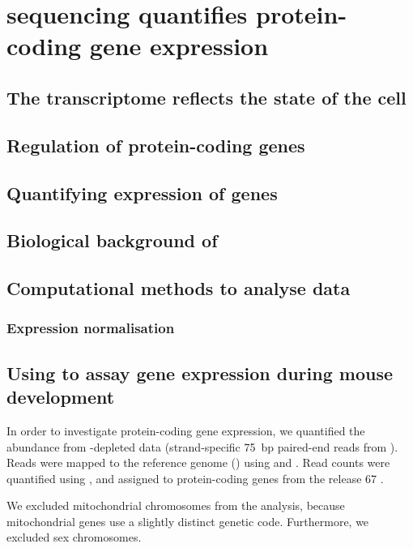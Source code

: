\chapter{ sequencing quantifies protein-coding gene expression}

\section{The transcriptome reflects the state of the cell}

\section{Regulation of protein-coding genes}

\section{Quantifying expression of  genes}

\section{Biological background of }

\section{Computational methods to analyse  data}

\subsection{Expression normalisation}

\section{Using  to assay gene expression during mouse development}

In order to investigate protein-coding gene expression, we quantified the \mrna
abundance from \rrna-depleted \rnaseq data (strand-specific \SI{75}{bp}
paired-end reads from  ). Reads were mapped to
the \mmu reference genome () using 
\citep{Fonseca:2014} and  \citep{Kim:2013}. Read counts were
quantified using  \citep{Anders:2014}, and assigned to
protein-coding genes from the  release \num{67}
\citep{Flicek:2014}.

We excluded mitochondrial chromosomes from the analysis, because mitochondrial
genes use a slightly distinct genetic code. Furthermore, we excluded
sex chromosomes.
